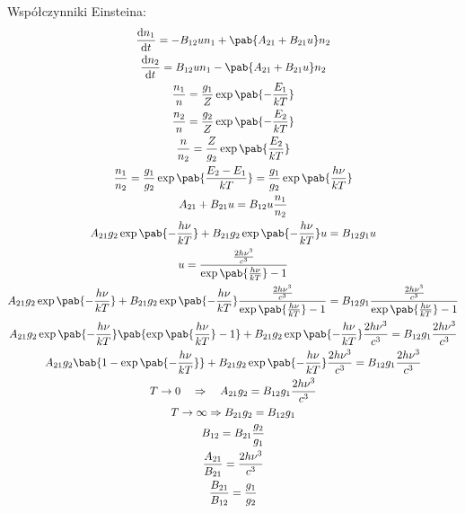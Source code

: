 Współczynniki Einsteina:
\begin{gather*}
	\odv{n_1}{t} = - B_{12} u n_1 + \pab{A_{21} + B_{21} u} n_2 \\
	\odv{n_2}{t} =   B_{12} u n_1 - \pab{A_{21} + B_{21} u} n_2 \\
	\frac{n_1}{n} = \frac{g_1}{Z}\exp\pab{-\frac{E_1}{kT}} \\
	\frac{n_2}{n} = \frac{g_2}{Z}\exp\pab{-\frac{E_2}{kT}} \\
	\frac{n}{n_2} = \frac{Z}{g_2}\exp\pab{\frac{E_2}{kT}} \\
	\frac{n_1}{n_2} = \frac{g_1}{g_2}\exp\pab{\frac{E_2 - E_1}{kT}} = \frac{g_1}{g_2}\exp\pab{\frac{h\nu}{kT}} \\
	A_{21} + B_{21} u = B_{12} u \frac{n_1}{n_2} \\
	A_{21}g_{2} \exp\pab{-\frac{h\nu}{kT}} + B_{21}g_{2} \exp\pab{-\frac{h\nu}{kT}} u = B_{12}g_{1} u \\
	u = \frac{\frac{2h\nu^3}{c^3}}{\exp\pab{\frac{h\nu}{kT}} - 1} \\
	A_{21}g_{2} \exp\pab{-\frac{h\nu}{kT}} + B_{21}g_{2} \exp\pab{-\frac{h\nu}{kT}} \frac{\frac{2h\nu^3}{c^3}}{\exp\pab{\frac{h\nu}{kT}} - 1} = B_{12}g_{1} \frac{\frac{2h\nu^3}{c^3}}{\exp\pab{\frac{h\nu}{kT}} - 1} \\
	A_{21}g_{2} \exp\pab{-\frac{h\nu}{kT}} \pab{\exp\pab{\frac{h\nu}{kT}} - 1} + B_{21}g_{2} \exp\pab{-\frac{h\nu}{kT}} \frac{2h\nu^3}{c^3} = B_{12}g_{1} \frac{2h\nu^3}{c^3} \\
	A_{21}g_{2} \bab{1 - \exp\pab{-\frac{h\nu}{kT}}} + B_{21}g_{2} \exp\pab{-\frac{h\nu}{kT}} \frac{2h\nu^3}{c^3} = B_{12}g_{1} \frac{2h\nu^3}{c^3} \\
	T \rightarrow 0 \quad\Rightarrow\quad 
	A_{21}g_{2} = B_{12}g_{1} \frac{2h\nu^3}{c^3} \\
	T \rightarrow \infty \Rightarrow 
	B_{21}g_{2} = B_{12}g_{1} \\
	B_{12} = B_{21}\frac{g_{2}}{g_{1}} \\
	\frac{A_{21}}{B_{21}} = \frac{2h\nu^3}{c^3} \\
	\frac{B_{21}}{B_{12}} = \frac{g_1}{g_2}
\end{gather*}